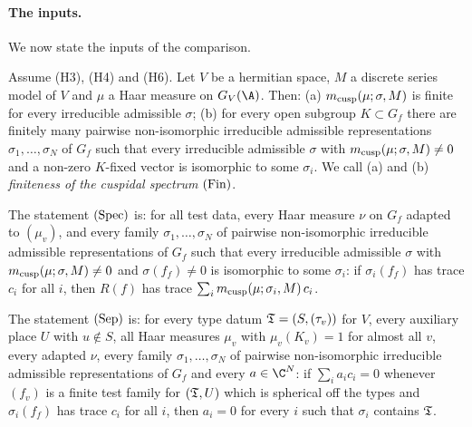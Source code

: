 \paragraph{The inputs.} We now state the inputs of the comparison.

\begin{proposition}\label{pf:multnc:specfin}
Assume (H3), (H4) and (H6). Let $V$ be a hermitian space, $M$ a discrete series model of $V$ and $\mu$ a Haar measure on
$G_V(\A)$. Then: (a) $m_{\mathrm{cusp}}(\mu;\sigma,M)$ is finite for every irreducible admissible $\sigma$; (b) for every open
subgroup $K\subset G_f$ there are finitely many pairwise non-isomorphic irreducible admissible representations
$\sigma_1,\dots,\sigma_N$ of $G_f$ such that every irreducible admissible $\sigma$ with $m_{\mathrm{cusp}}(\mu;\sigma,M)\ne0$ and a
non-zero $K$-fixed vector is isomorphic to some $\sigma_i$. We call (a) and (b) \emph{finiteness of the cuspidal
spectrum} $\textup{(Fin)}$.
\end{proposition}

\begin{definition}\label{pf:multnc:def-spectrace}
The statement $\textup{(Spec)}$ is: for all test data, every Haar measure $\nu$ on $G_f$ adapted to $(\mu_v)$, and every
family $\sigma_1,\dots,\sigma_N$ of pairwise non-isomorphic irreducible admissible representations of $G_f$ such that every
irreducible admissible $\sigma$ with $m_{\mathrm{cusp}}(\mu;\sigma,M)\ne0$ and $\sigma(f_f)\ne0$ is isomorphic to some $\sigma_i$: if
$\sigma_i(f_f)$ has trace $c_i$ for all $i$, then $R(f)$ has trace $\sum_im_{\mathrm{cusp}}(\mu;\sigma_i,M)\,c_i$.
\end{definition}

\begin{definition}[Separation]\label{pf:multnc:def-separation}
The statement $\textup{(Sep)}$ is: for every type datum $\mathfrak{T}=(S,(\tau_v))$ for $V$, every auxiliary place $U$ with
$u\notin S$, all Haar measures $\mu_v$ with $\mu_v(K_v)=1$ for almost all $v$, every adapted $\nu$, every family
$\sigma_1,\dots,\sigma_N$ of pairwise non-isomorphic irreducible admissible representations of $G_f$ and every $a\in\C^N$:
if $\sum_ia_ic_i=0$ whenever $(f_v)$ is a finite test family for $(\mathfrak{T},U)$ which is spherical off the types and
$\sigma_i(f_f)$ has trace $c_i$ for all $i$, then $a_i=0$ for every $i$ such that $\sigma_i$ contains $\mathfrak{T}$.
\end{definition}

